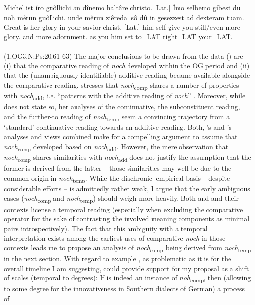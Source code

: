 \documentclass[output=paper
,modfonts
,nonflat]{langsci/langscibook}
\begin{document}
\ea\gll Michel ist íro guôllichi an dînemo haltâre christo. [Lat.] Ímo selbemo gíbest du noh mêrun guôllichi. unde mêrun ziêreda. sô dû in gesezzest ad dexteram tuam.\\
       Great is her glory in your savior christ. [Lat.] him self give you still/even more glory. and more adornment. as you him set to\_LAT right\_LAT your\_LAT.\\
\label{OG3_noch_more_glory_first} \\ (1.OG3.N:Ps:20.61-63)
\z
The major conclusions to be drawn from the data () are (i) that the comparative reading of \textit{noch} developed within the OG period and (ii) that the (unambiguously identifiable) additive reading became available alongside the comparative reading. \citeauthor{umbach2009a_comp} \citeyearpar{umbach2009a_comp} stresses that \textit{noch}\textsubscript{comp} shares a number of properties with \textit{noch}\textsubscript{add}, i.e. ``patterns with the additive reading of \textit{noch}'' \citep[p.9]{umbach2009a_comp}. Moreover, while \citeauthor{beck2016a_sub} does not state so, her \citeyearpar{beck2016a_sub} analyses of the continuative, the subconstituent reading, and the further-to reading of \textit{noch}\textsubscript{temp} seem a convincing trajectory from a `standard' continuative reading towards an additive reading. Both, \citeauthor{umbach2009a_comp}'s \citeyearpar{umbach2009a_comp} and \citeauthor{beck2016a_sub}'s \citeyearpar{beck2016a_sub} analyses and views combined make for a compelling argument to assume that \textit{noch}\textsubscript{comp} developed based on \textit{noch}\textsubscript{add}. However, the mere observation that \textit{noch}\textsubscript{comp} shares similarities with \textit{noch}\textsubscript{add} does not justify the assumption that the former is derived from the latter -- those similarities may well be due to the common origin in \textit{noch}\textsubscript{temp}. While the diachronic, empirical basis -- despite considerable efforts -- is admittedly rather weak, I argue that the early ambiguous cases (\textit{noch}\textsubscript{comp} and \textit{noch}\textsubscript{temp}) should weigh more heavily. Both  and  and their contexts license a temporal reading (especially when excluding the comparative operator for the sake of contrasting the involved meaning components as minimal pairs introspectively). The fact that this ambiguity with a temporal interpretation exists among the earliest uses of comparative \textit{noch} in those contexts leads me to propose an analysis of \textit{noch}\textsubscript{comp} being derived from \textit{noch}\textsubscript{temp} in the next section. With regard to example , as problematic as it is for the overall timeline I am suggesting,  could provide support for my proposal as a shift of scales (temporal to degrees): If  is indeed an instance of \textit{noh}\textsubscript{comp}, then (allowing to some degree for the innovativeness in Southern dialects of German) a process of 
\end{document}
